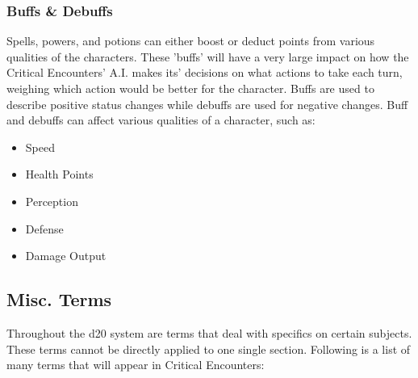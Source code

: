 \documentclass[12pt,a4paper]{report}
\begin{document}
		\subsubsection{Buffs \& Debuffs}
			Spells, powers, and potions can either boost or deduct points from various qualities of the characters. These 'buffs' will have a very large impact on how the Critical Encounters' A.I. makes its' decisions on what actions to take each turn, weighing which action would be better for the character. Buffs are used to describe positive status changes while debuffs are used for negative changes. Buff and debuffs can affect various qualities of a character, such as:
			\begin{multicols}{2}
				\begin{itemize}
					\item Speed
					\item Health Points
					\item Perception
					\item Defense
					\item Damage Output
				\end{itemize}
		\end{multicols}
		\newpage
		\subsection{Misc. Terms}
			Throughout the d20 system are terms that deal with specifics on certain subjects. These terms cannot be directly applied to one single section. Following is a list of many terms that will appear in Critical Encounters:
\end{document}
